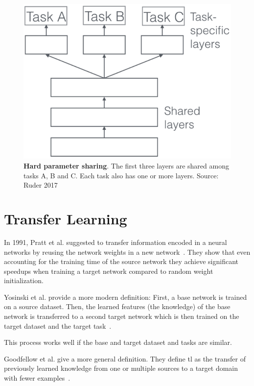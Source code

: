 \begin{figure}[ht]
    \centering
    \includegraphics[scale=0.5]{figures/03_theory/03_mtl_architecture}
    \caption{\textbf{Hard parameter sharing}. The first three layers are shared among tasks A, B and C. Each task also has one or more layers. Source: Ruder 2017~\cite{Ruder2017}}
    \label{fig:03_mtl_architecture}
\end{figure}

\section{Transfer Learning}
\label{sec:TransferLearning}

In 1991, Pratt et al. suggested to transfer information encoded in a neural networks by reusing the network weights in a new network~\cite{Pratt1991}. They show that even accounting for the training time of the source network they achieve significant speedups when training a target network compared to random weight initialization.
\medskip

Yosinski et al. provide a more modern definition: First, a base network is trained on a source dataset. Then, the learned features {(the knowledge)} of the base network is transferred to a second target network which is then trained on the target dataset and the target task~\cite{Yosinski2014}. 

This process works well if the base and target dataset and tasks are similar.
\medskip

Goodfellow et al. give a more general definition. They define \gls{tl} as the transfer of previously learned knowledge from one or multiple sources to a target domain with fewer examples~\cite{Goodfellow2016}.

